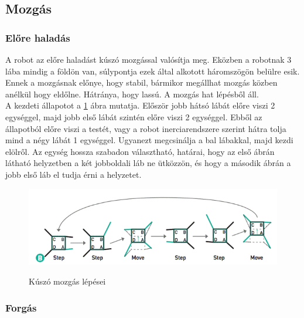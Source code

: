 \documentclass{article}
\begin{document}
\subsection{Mozgás}
\subsubsection{Előre haladás}
A robot az előre haladást kúszó mozgással valósítja meg. Eközben a robotnak 3 lába mindig a földön van, súlypontja ezek által alkotott háromszögön belülre esik. Ennek a mozgásnak előnye, hogy stabil, bármikor megállhat mozgás közben anélkül hogy eldőlne. Hátránya, hogy lassú. A mozgás hat lépésből áll.\\
A kezdeti állapotot a \ref{fig:mozgas} ábra mutatja. Először jobb hátsó lábát előre viszi 2 egységgel, majd jobb első lábát szintén előre viszi 2 egységgel. Ebből az állapotból előre viszi a testét, vagy a robot inerciarendszere szerint hátra tolja mind a négy lábát 1 egységgel. Ugyanezt megcsinálja a bal lábakkal, majd kezdi elölről. Az egység hossza szabadon választható, határai, hogy az első ábrán látható helyzetben a két jobboldali láb ne ütközzön, és hogy a második ábrán a jobb első láb el tudja érni a helyzetet.
\begin{figure}
	\begin{minipage}{0.9\textwidth}
		\caption{Kúszó mozgás lépései}
		\includegraphics[width=\textwidth]{kuszomozgas}
		\label{fig:mozgas}
	\end{minipage}
\end{figure}
\subsubsection{Forgás}
	
\end{document}

